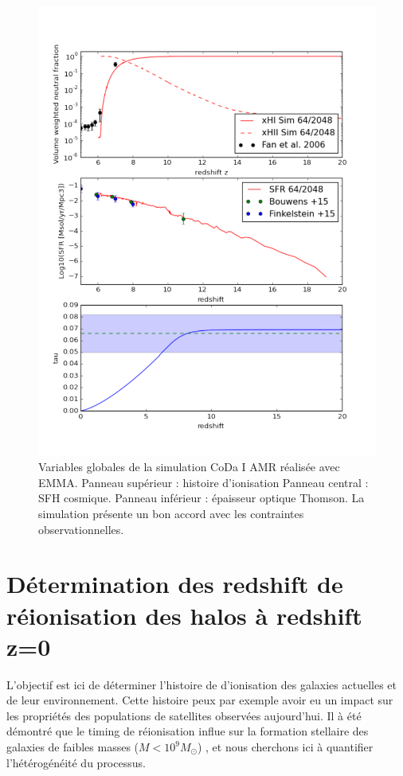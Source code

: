 \begin{figure}
        \includegraphics[width=.95\linewidth]{img/05/x_sfr_tau.pdf} 
        \caption[Contraintes CoDa I AMR]{ Variables globales de la simulation \ac{CoDa} I \ac{AMR} réalisée avec EMMA.
        Panneau supérieur : histoire d'ionisation
		Panneau central : SFH cosmique.
        Panneau inférieur : épaisseur optique Thomson.
        La simulation présente un bon accord avec les contraintes observationnelles.
		\label{fig:presCODAEMMA}}
\end{figure}


\section{Détermination des redshift de réionisation des halos à redshift z=0}

L'objectif est ici de déterminer l'histoire de d'ionisation des galaxies actuelles et de leur environnement.
Cette histoire peux par exemple avoir eu un impact sur les propriétés des populations de satellites observées aujourd'hui.
Il à été démontré que le timing de réionisation influe sur la formation stellaire des galaxies de faibles masses ($M<10^9M_\odot$) \citep{ocvirk_reionization_2014}, et nous cherchons ici à quantifier l'hétérogénéité du processus.

